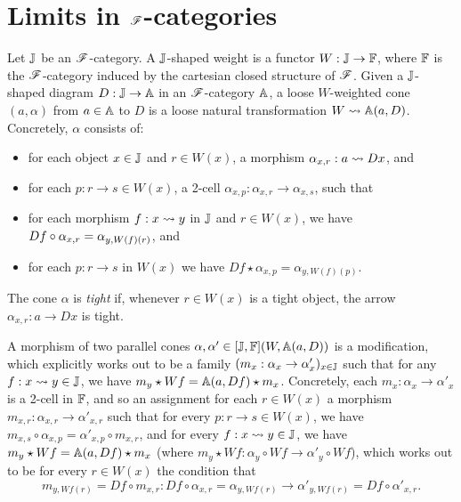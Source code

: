 \documentclass[../thesis.tex]{subfiles}
\begin{document}
  \section{Limits in \texorpdfstring{${\mathscr{F}}$}{F}-categories}

  \begin{definition}
    Let ${\mathbb{J}}$ be an ${\mathscr{F}}$-category. A ${\mathbb{J}}$-shaped weight is a functor $W : {\mathbb{J}} \to {\mathbb{F}}$, where ${\mathbb{F}}$
    is the ${\mathscr{F}}$-category induced by the cartesian closed structure of ${\mathscr{F}}$. Given a ${\mathbb{J}}$-shaped
    diagram $D : {\mathbb{J}} \to {\mathbb{A}}$ in an ${\mathscr{F}}$-category ${\mathbb{A}}$, a loose $W$-weighted cone $(a,\alpha)$
    from $a \in {\mathbb{A}}$ to $D$ is a loose natural transformation $W \rightsquigarrow {\mathbb{A}}(a,D)$. Concretely,
    $\alpha$ consists of:
    \begin{itemize}
      \item for each object $x \in {\mathbb{J}}$ and $r \in W(x)$, a morphism $\alpha_{x,r} : a \rightsquigarrow Dx$,
        and
      \item for each $p : r \to s \in W(x)$, a 2-cell $\alpha_{x,p} : \alpha_{x,r} \to \alpha_{x,s}$,
        such that
      \item for each morphism $f : x \rightsquigarrow y$ in ${\mathbb{J}}$ and $r \in W(x)$, we have $Df \circ \alpha_%
        {x,r} = \alpha_{y,W(f)(r)}$, and
      \item for each $p : r \to s$ in $W(x)$ we have $Df \star \alpha_{x,p} = \alpha_{y,W(f)(p)}$.
    \end{itemize} 
    The cone $\alpha$ is \emph{tight} if, whenever $r \in W(x)$ is a tight object, the arrow
    $\alpha_{x,r} : a \to Dx$ is tight.

    A morphism of two parallel cones $\alpha,\alpha' \in [{\mathbb{J}},{\mathbb{F}}](W,{\mathbb{A}}(a,D))$ is a modification,
    which explicitly works out to be a family $(m_x : \alpha_x \to \alpha'_x)_{x \in {\mathbb{J}}}$ such
    that for any $f : x \rightsquigarrow y \in {\mathbb{J}}$, we have $m_y \star Wf = {\mathbb{A}}(a,Df) \star m_x$. Concretely,
    each $m_x : \alpha_x \to \alpha'_x$ is a 2-cell in ${\mathbb{F}}$, and so an assignment for each
    $r \in W(x)$ a morphism $m_{x,r} : \alpha_{x,r} \to \alpha'_{x,r}$ such that for every $p :
    r \to s \in W(x)$, we have $m_{x,s} \circ \alpha_{x,p} = \alpha'_{x,p} \circ m_{x,r}$,
    and for every $f : x \rightsquigarrow y \in {\mathbb{J}}$, we have $m_y \star Wf = {\mathbb{A}}(a,Df) \star m_x$
    (where $m_y \star Wf : \alpha_y \circ Wf \to \alpha'_y \circ Wf$), which
    works out to be for every $r \in W(x)$ the condition that
    \[m_{y,Wf(r)} = Df \circ m_{x,r} : Df \circ \alpha_{x,r} = \alpha_{y,Wf(r)} \to \alpha'_{y,Wf(r)}
    = Df \circ \alpha'_{x,r}.\]
  \end{definition}
\end{document}
